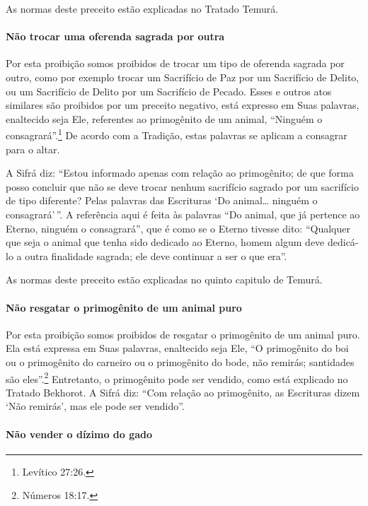 As normas deste preceito estão explicadas no Tratado Temurá.

\paragraph{Não trocar uma oferenda sagrada por outra}

Por esta proibição somos proibidos de trocar um tipo de oferenda sagrada
por outro, como por exemplo trocar um Sacrifício de Paz por um
Sacrifício de Delito, ou um Sacrifício de Delito por um Sacrifício de
Pecado. Esses e outros atos similares são proibidos por um preceito
negativo, está expresso em Suas palavras, enaltecido seja Ele,
referentes ao primogênito de um animal, ``Ninguém o consagrará''.\footnote{Levítico 27:26.} De acordo com a Tradição, estas palavras se aplicam a
consagrar para o altar.

A Sifrá diz: ``Estou informado apenas com relação ao primogênito; de que
forma posso concluir que não se deve trocar nenhum sacrifício sagrado
por um sacrifício de tipo diferente? Pelas palavras das Escrituras `Do
animal\ldots{} ninguém o consagrará'\,''. A referência aqui é feita às
palavras ``Do animal, que já pertence ao Eterno, ninguém o consagrará'',
que é como se o Eterno tivesse dito: ``Qualquer que seja o animal que
tenha sido dedicado ao Eterno, homem algum deve dedicá-lo a outra
finalidade sagrada; ele deve continuar a ser o que era''.

As normas deste preceito estão explicadas no quinto capitulo de Temurá.

\paragraph{Não resgatar o primogênito de um animal puro}

Por esta proibição somos proibidos de resgatar o primogênito de um
animal puro. Ela está expressa em Suas palavras, enaltecido seja Ele,
``O primogênito do boi ou o primogênito do carneiro ou o primogênito do
bode, não remirás; santidades são eles''.\footnote{Números 18:17.} Entretanto, o
primogênito pode ser vendido, como está explicado no Tratado Bekhorot. A
Sifrá diz: ``Com relação ao primogênito, as Escrituras dizem `Não
remirás', mas ele pode ser vendido''.

\paragraph{Não vender o dízimo do gado}

